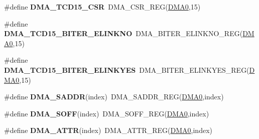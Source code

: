\begin{DoxyCompactItemize}
\item 
\#define {\bfseries D\+M\+A\+\_\+\+T\+C\+D15\+\_\+\+C\+SR}~D\+M\+A\+\_\+\+C\+S\+R\+\_\+\+R\+EG(\hyperlink{group__DMA__Peripheral__Access__Layer_ga4103044f9ca209772f513dc694513ffb}{D\+M\+A0},15)\hypertarget{group__DMA__Register__Accessor__Macros_gab094c103d137f49a7195ff869b5cade1}{}\label{group__DMA__Register__Accessor__Macros_gab094c103d137f49a7195ff869b5cade1}

\item 
\#define {\bfseries D\+M\+A\+\_\+\+T\+C\+D15\+\_\+\+B\+I\+T\+E\+R\+\_\+\+E\+L\+I\+N\+K\+NO}~D\+M\+A\+\_\+\+B\+I\+T\+E\+R\+\_\+\+E\+L\+I\+N\+K\+N\+O\+\_\+\+R\+EG(\hyperlink{group__DMA__Peripheral__Access__Layer_ga4103044f9ca209772f513dc694513ffb}{D\+M\+A0},15)\hypertarget{group__DMA__Register__Accessor__Macros_gaf8dff77e7ddaad31d2a84ccd50a0714b}{}\label{group__DMA__Register__Accessor__Macros_gaf8dff77e7ddaad31d2a84ccd50a0714b}

\item 
\#define {\bfseries D\+M\+A\+\_\+\+T\+C\+D15\+\_\+\+B\+I\+T\+E\+R\+\_\+\+E\+L\+I\+N\+K\+Y\+ES}~D\+M\+A\+\_\+\+B\+I\+T\+E\+R\+\_\+\+E\+L\+I\+N\+K\+Y\+E\+S\+\_\+\+R\+EG(\hyperlink{group__DMA__Peripheral__Access__Layer_ga4103044f9ca209772f513dc694513ffb}{D\+M\+A0},15)\hypertarget{group__DMA__Register__Accessor__Macros_gac55c6f49386c76dc2d5705da3b7efb7e}{}\label{group__DMA__Register__Accessor__Macros_gac55c6f49386c76dc2d5705da3b7efb7e}

\item 
\#define {\bfseries D\+M\+A\+\_\+\+S\+A\+D\+DR}(index)~D\+M\+A\+\_\+\+S\+A\+D\+D\+R\+\_\+\+R\+EG(\hyperlink{group__DMA__Peripheral__Access__Layer_ga4103044f9ca209772f513dc694513ffb}{D\+M\+A0},index)\hypertarget{group__DMA__Register__Accessor__Macros_gac79de6ef4790e670b262d808b0851c33}{}\label{group__DMA__Register__Accessor__Macros_gac79de6ef4790e670b262d808b0851c33}

\item 
\#define {\bfseries D\+M\+A\+\_\+\+S\+O\+FF}(index)~D\+M\+A\+\_\+\+S\+O\+F\+F\+\_\+\+R\+EG(\hyperlink{group__DMA__Peripheral__Access__Layer_ga4103044f9ca209772f513dc694513ffb}{D\+M\+A0},index)\hypertarget{group__DMA__Register__Accessor__Macros_gaf550e7107851b8d89ba562c92147a7d8}{}\label{group__DMA__Register__Accessor__Macros_gaf550e7107851b8d89ba562c92147a7d8}

\item 
\#define {\bfseries D\+M\+A\+\_\+\+A\+T\+TR}(index)~D\+M\+A\+\_\+\+A\+T\+T\+R\+\_\+\+R\+EG(\hyperlink{group__DMA__Peripheral__Access__Layer_ga4103044f9ca209772f513dc694513ffb}{D\+M\+A0},index)\hypertarget{group__DMA__Register__Accessor__Macros_ga9f4a8700fcf390a0c91df4a5698550ba}{}\label{group__DMA__Register__Accessor__Macros_ga9f4a8700fcf390a0c91df4a5698550ba}


\end{DoxyCompactItemize}
